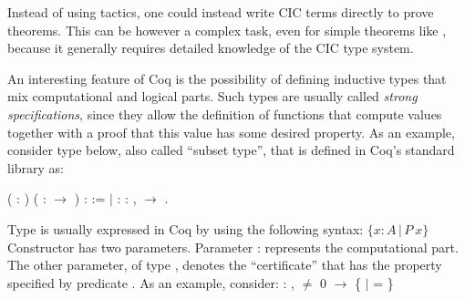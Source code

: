 Instead of using tactics, one could instead write CIC terms directly
to prove theorems.  This can be however a complex task, even for
simple theorems like , because it generally requires
detailed knowledge of the CIC type system.


An interesting feature of Coq is the possibility of defining inductive
types that mix computational and logical parts. Such types are usually
called \emph{strong specifications}, since they allow the definition
of functions that compute values together with a proof that this value
has some desired property. As an example, consider type 
below, also called ``subset type'', that is defined in Coq's standard
library as:
 \begin{coqdoccode}
\coqdocnoindent
\coqdoceol
\coqdocnoindent
{}  ( : )	( :  \ensuremath{\rightarrow} ) :  :=\coqdoceol
\coqdocindent{0.50em}
\ensuremath{|}  : \coqdockw{\ensuremath{\forall}}  : ,   \ensuremath{\rightarrow}   .\coqdoceol
\coqdocemptyline
\end{coqdoccode}


Type  is usually expressed in Coq by using the following
syntax: $\{x : A \,\vert\,P\:x\}$
Constructor  has two
parameters. Parameter  :  represents the
computational part. The other parameter, of type  , denotes
the ``certificate'' that  has the property specified by
predicate . As an example, consider:
\coqdoceol
\coqdocemptyline
\coqdocnoindent
\coqdockw{\ensuremath{\forall}}  : ,  \ensuremath{\not=} 0 \ensuremath{\rightarrow} \{ \ensuremath{|}  =  \}

